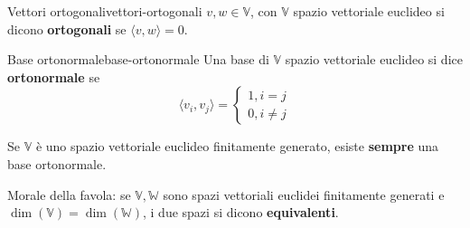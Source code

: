\documentclass[12pt]{report}
\newcommand{\V}{\mathbb{V}}
\newcommand{\W}{\mathbb{W}}
\begin{document}
	\begin{definizione}{Vettori ortogonali}{vettori-ortogonali}
		$v, w \in \V$, con $\V$ spazio vettoriale euclideo si dicono \textbf{ortogonali} se $\langle v, w \rangle = 0$.
	\end{definizione}
	
	\begin{definizione}{Base ortonormale}{base-ortonormale}
		Una base di $\V$ spazio vettoriale euclideo si dice \textbf{ortonormale} se
		\[
			\langle v_i, v_j \rangle = 
			\begin{cases}
				1, i = j\\
				0, i \neq j
			\end{cases}
		\]
	\end{definizione}
	
	\begin{proposizione}{}{}
		Se $\V$ è uno spazio vettoriale euclideo finitamente generato, esiste \textbf{sempre} una base ortonormale.
	\end{proposizione}
	
	Morale della favola: se $\V, \W$ sono spazi vettoriali euclidei finitamente generati e $\dim(\V) = \dim(\W)$, i due spazi si dicono \textbf{equivalenti}.
	
\end{document}
